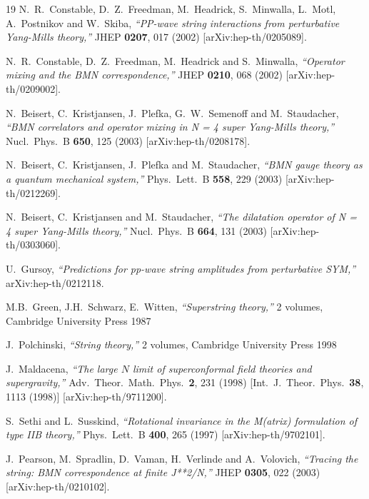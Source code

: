\documentclass[nohyper,12pt,letterpaper]{JHEP3}
\begin{document}
\begin{thebibliography}{19}
N.~R.~Constable, D.~Z.~Freedman, M.~Headrick, S.~Minwalla, L.~Motl,
A.~Postnikov and W.~Skiba,
{\it ``PP-wave string interactions from perturbative Yang-Mills theory,''}
JHEP {\bf 0207}, 017 (2002)
[arXiv:hep-th/0205089].

N.~R.~Constable, D.~Z.~Freedman, M.~Headrick and S.~Minwalla,
{\it ``Operator mixing and the BMN correspondence,''}
JHEP {\bf 0210}, 068 (2002)
[arXiv:hep-th/0209002].

N.~Beisert, C.~Kristjansen, J.~Plefka, G.~W.~Semenoff and M.~Staudacher,
{\it ``BMN correlators and operator mixing in N = 4 super Yang-Mills 
theory,''}
Nucl.\ Phys.\ B {\bf 650}, 125 (2003)
[arXiv:hep-th/0208178].

N.~Beisert, C.~Kristjansen, J.~Plefka and M.~Staudacher,
{\it ``BMN gauge theory as a quantum mechanical system,''}
Phys.\ Lett.\ B {\bf 558}, 229 (2003)
[arXiv:hep-th/0212269].

N.~Beisert, C.~Kristjansen and M.~Staudacher,
{\it ``The dilatation operator of N = 4 super Yang-Mills theory,''}
Nucl.\ Phys.\ B {\bf 664}, 131 (2003)
[arXiv:hep-th/0303060].

U.~Gursoy,
{\it ``Predictions for pp-wave string amplitudes from perturbative SYM,''}
arXiv:hep-th/0212118.

M.B.~Green, J.H.~Schwarz, E.~Witten,
{\it ``Superstring theory,''} 2 volumes,
Cambridge University Press 1987

J.~Polchinski,
{\it ``String theory,''}
2 volumes, Cambridge University Press 1998


J.~Maldacena,
{\it ``The large $N$ limit of superconformal field theories and
supergravity,''}
Adv.\ Theor.\ Math.\ Phys.\  {\bf 2}, 231 (1998)
[Int.\ J.\ Theor.\ Phys.\  {\bf 38}, 1113 (1998)]
[arXiv:hep-th/9711200].

S.~Sethi and L.~Susskind,
{\it ``Rotational invariance in the M(atrix) formulation of type IIB theory,''}
Phys.\ Lett.\ B {\bf 400}, 265 (1997)
[arXiv:hep-th/9702101].

J.~Pearson, M.~Spradlin, D.~Vaman, H.~Verlinde and A.~Volovich,
{\it ``Tracing the string: BMN correspondence at finite J**2/N,''}
JHEP {\bf 0305}, 022 (2003)
[arXiv:hep-th/0210102].

\end{thebibliography}
\end{document}

